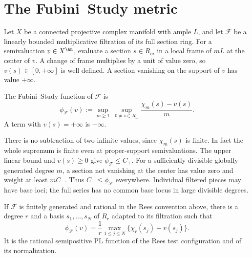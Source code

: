 \section{The Fubini--Study metric}
\label{sec:rf-fubini-study}

Let $X$ be a connected projective complex manifold with ample $L$, and let $\mathcal F$ be a linearly bounded multiplicative filtration of its full section ring. For a semivaluation $v\in X^{\An}$, evaluate a section $s\in R_m$ in a local frame of $mL$ at the center of $v$. A change of frame multiplies by a unit of value zero, so $v(s)\in[0,+\infty]$ is well defined. A section vanishing on the support of $v$ has value $+\infty$.

\begin{definition}\label{def:rf-fs-metric}
The Fubini--Study function of $\mathcal F$ is
\[
 \phi_{\mathcal F}(v)
 :=\sup_{m\geq1}\ \sup_{0\ne s\in R_m}
             \frac{\chi_m(s)-v(s)}{m}.
\tag{65.8}\label{eq:rf-fs-metric}
\]
A term with $v(s)=+\infty$ is $-\infty$.
\end{definition}

There is no subtraction of two infinite values, since $\chi_m(s)$ is finite. In fact the whole supremum is finite even at proper-support semivaluations. The upper linear bound and $v(s)\geq0$ give $\phi_{\mathcal F}\leq C_+$. For a sufficiently divisible globally generated degree $m$, a section not vanishing at the center has value zero and weight at least $mC_-$. Thus $C_-\leq\phi_{\mathcal F}$ everywhere. Individual filtered pieces may have base loci; the full series has no common base locus in large divisible degrees.

\noindent\begin{minipage}{\linewidth}
\begin{proposition}\label{prop:rf-fg-pl}
If $\mathcal F$ is finitely generated and rational in the Rees convention above, there is a degree $r$ and a basis $s_1,\ldots,s_N$ of $R_r$ adapted to its filtration such that
\[
 \phi_{\mathcal F}(v)
       =\frac1r\max_{1\leq j\leq N}
                     \{\chi_r(s_j)-v(s_j)\}.
\tag{65.9}\label{eq:rf-finite-fs}
\]
It is the rational semipositive PL function of the Rees test configuration and of its normalization.
\end{proposition}
\end{minipage}\par

